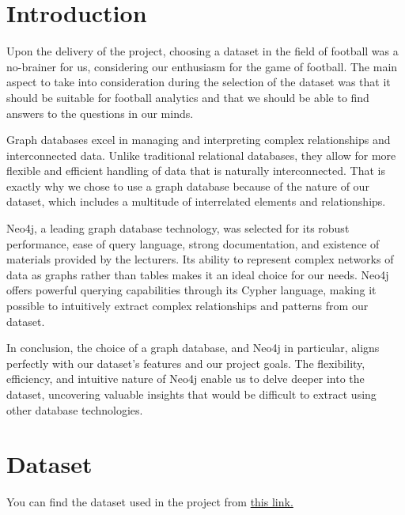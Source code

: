 \documentclass{Configuration_Files/PoliMi3i_thesis}
\begin{document}
\mainmatter %


\chapter{Introduction}

Upon the delivery of the project, choosing a dataset in the field of football was a no-brainer for us, considering our enthusiasm for the game of football. The main aspect to take into consideration during the selection of the dataset was that it should be suitable for football analytics and that we should be able to find answers to the questions in our minds.

Graph databases excel in managing and interpreting complex relationships and interconnected data. Unlike traditional relational databases, they allow for more flexible and efficient handling of data that is naturally interconnected. That is exactly why we chose to use a graph database because of the nature of our dataset, which includes a multitude of interrelated elements and relationships.

Neo4j, a leading graph database technology, was selected for its robust performance, ease of query language, strong documentation, and existence of materials provided by the lecturers. Its ability to represent complex networks of data as graphs rather than tables makes it an ideal choice for our needs. Neo4j offers powerful querying capabilities through its Cypher language, making it possible to intuitively extract complex relationships and patterns from our dataset.

In conclusion, the choice of a graph database, and Neo4j in particular, aligns perfectly with our dataset's features and our project goals. The flexibility, efficiency, and intuitive nature of Neo4j enable us to delve deeper into the dataset, uncovering valuable insights that would be difficult to extract using other database technologies.




\chapter{Dataset}

You can find the dataset used in the project from \href{https://www.kaggle.com/datasets/davidcariboo/player-scores/data}{this link.}
\end{document}
